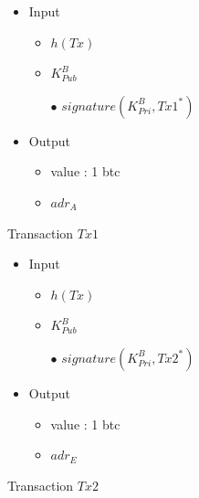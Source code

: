 \documentclass[11pt,a4paper]{article}
\begin{document}
\begin{figure}[H]
\begin{itemize}
\renewcommand{\labelitemi}{$\bullet$}
\renewcommand{\labelitemii}{$\star$}

\item Input
\begin{itemize}
\item $h(Tx)$
\item $K_{Pub}^{B}$
\item[$\bullet$] $signature(K_{Pri}^{B}, Tx1^*)$
\end{itemize}

\item Output
\begin{itemize}
\item value : 1 btc
\item $adr_A$
\end{itemize}

\end{itemize}

\caption{Transaction $Tx1$}
\end{figure}



\begin{figure}[H]
\begin{itemize}
\renewcommand{\labelitemi}{$\bullet$}
\renewcommand{\labelitemii}{$\star$}

\item Input
\begin{itemize}
\item $h(Tx)$
\item $K_{Pub}^{B}$
\item[$\bullet$] $signature(K_{Pri}^{B}, Tx2^*)$
\end{itemize}

\item Output
\begin{itemize}
\item value : 1 btc
\item $adr_E$
\end{itemize}

\end{itemize}

\caption{Transaction $Tx2$}
\end{figure}
\end{document}
